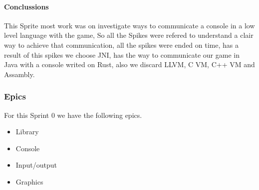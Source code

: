 \paragraph{Conclussions}
This Sprite most work was on investigate ways to communicate a console in a low level language with the game, So all the Spikes were refered to understand a clair way to achieve that communication, all the spikes were ended on time, has a result of this spikes we choose JNI, has the way to communicate our game in Java with a console writed on Rust, also we discard LLVM, C VM, C++ VM and Assambly.

\subsubsection{Epics}
For this Sprint 0 we have the following epics.
\begin{itemize}
    \item Library
    \item Console
    \item Input/output
    \item Graphics
\end{itemize}
